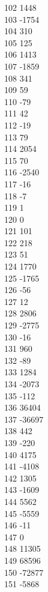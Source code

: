 { 102	1448 \\
 103	-1754 \\
 104	310 \\
 105	125 \\
 106	1413 \\
 107	-1859 \\
 108	341 \\
 109	59 \\
 110	-79 \\
 111	42 \\
 112	-19 \\
 113	79 \\
 114	2054 \\
 115	70 \\
 116	-2540 \\
 117	-16 \\
 118	-7 \\
 119	1 \\
 120	0 \\
 121	101 \\
 122	218 \\
 123	51 \\
 124	1770 \\
 125	-1765 \\
 126	-56 \\
 127	12 \\
 128	2806 \\
 129	-2775 \\
 130	-16 \\
 131	960 \\
 132	-89 \\
 133	1284 \\
 134	-2073 \\
 135	-112 \\
 136	36404 \\
 137	-36697 \\
 138	442 \\
 139	-220 \\
 140	4175 \\
 141	-4108 \\
 142	1305 \\
 143	-1609 \\
 144	5562 \\
 145	-5559 \\
 146	-11 \\
 147	0 \\
 148	11305 \\
 149	68596 \\
 150	-72877 \\
 151	-5868 \\
}
